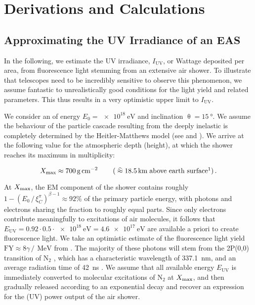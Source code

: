 
\chapter{Derivations and Calculations}
\label{app:derivation}


\section{Approximating the UV Irradiance of an EAS}
\label{app:cr-uv-irradiance}

In the following, we estimate the UV irradiance, $I_\text{UV}$, or Wattage 
deposited per area, from fluorescence light stemming from an extensive air 
shower. To illustrate that telescopes need to be incredibly sensitive to 
observe this phenomenon, we assume fantastic to unrealistically good conditions
for the \UV light yield and related parameters. This thus results in a very 
optimistic upper limit to $I_\text{UV}$.

We consider an \EAS of energy $E_0 = \SI{e18}{\eV}$ and inclination 
$\uptheta=\SI{15}{\degree}$. We assume the behaviour of the particle cascade 
resulting from the deeply inelastic is completely determined by the 
Heitler-Matthews model (see  and 
\cite{Matthews2005, Risse2006}). We arrive at the following value for the 
atmospheric depth (height), at which the shower reaches its maximum in 
multiplicity:

\begin{equation}
\label{eq:irradiance-multiplicity}
\Xmax \approx \SI{700}{\gram\per\centi\meter\squared}\qquad\left(\;\widehat{\approx}\;\SI{18.5}{\kilo\meter}\;\text{above earth surface}\footnotemark\right).
\end{equation}

At $X_\mathrm{max}$, the EM component of the shower contains roughly
$1-\left(E_0\,/\,\xi^\pi_C\right)^{\beta-1}\approx92\%$ of the primary particle 
energy, with photons and electrons sharing the fraction to roughly equal parts.
Since only electrons contribute meaningfully to excitations of air molecules, it 
follows that $E_\text{UV}=0.92\cdot0.5\cdot\SI{e18}{\electronvolt}=
\SI{4.6e17}{\electronvolt}$ are available a priori to create fluorescence light.
We take an optimistic estimate of the fluorescence light yield 
$\text{FY}\approx8\gamma\,/\,\SI{}{\mega\electronvolt}$ from \cite{Keilhauer2013}. 
The majority of these photons will stem from the 2P(0,0) transition of 
N$_2$ \cite{Ave2008}, which has a characteristic wavelength of 
\SI{337.1}{\nano\meter}, and an average radiation time of \SI{42}{\nano\second} 
\cite{Lean1989}. We assume that all available energy $E_\text{UV}$ is immediately 
converted to molecular excitations of N$_2$ at $X_\mathrm{max}$, and then gradually 
released according to an exponential decay and recover an expression for the (UV) 
power output of the air shower.

